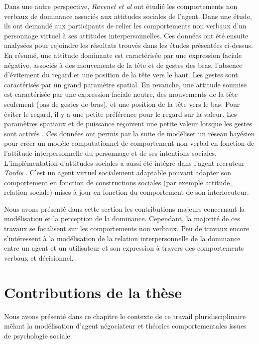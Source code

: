 		Dans une autre perspective,  \emph{Ravenet et al} \cite{ravenet2013user} ont étudié les comportements non verbaux de dominance associés aux attitudes sociales de l'agent. Dans une étude, ils ont demandé aux participants de relier les comportements non verbaux d'un personnage virtuel à ses attitudes interpersonnelles. Ces données ont été ensuite analysées pour rejoindre les résultats trouvés dans les études présentées ci-dessus.  
		En résumé, une attitude dominante est caractérisée par une expression faciale négative, associés à des mouvements de la tête et de gestes des bras, l'absence d'évitement du regard et une position de la tête vers le haut. Les gestes sont caractérisés par un grand paramètre spatial. En revanche, une attitude soumise est caractérisée par une expression faciale neutre, des mouvements de la tête seulement (pas de gestes de bras), et une position de la tête vers le bas. Pour éviter le regard, il y a une petite préférence pour le regard sur la valeur. Les paramètres spatiaux et de puissance reçoivent une petite valeur lorsque les gestes sont activés \cite{ravenet2013user}. Ces données ont permis par la suite de
		modéliser un réseau bayésien pour créer un modèle computationnel de comportement non verbal en fonction de l'attitude interpersonnelle du personnage et de ses intentions sociales.
		L'implémentation d'attitudes sociales a aussi été intégré dans l'agent recruteur \emph{Tardis} \cite{youssef2015towards}. C'est un agent virtuel socialement adaptable pouvant adapter son comportement en fonction de constructions sociales (par exemple attitude, relation sociale) mises à jour en fonction du comportement de son interlocuteur. 
		
		Nous avons présenté dans cette section les contributions majeurs concernant la modélisation et la perception de la dominance. Cependant, la majorité de ces travaux se focalisent sur les comportements non verbaux. Peu de travaux encore s'intéressent à la modélisation de la relation interpersonnelle de la dominance entre un agent et un utilisateur et son expression à travers des comportements verbaux et décisionnel. 
	
	
		\section{Contributions de la thèse}
			Nous avons présenté dans ce chapitre le contexte de ce travail pluridisciplinaire mêlant la modélisation d'agent négociateur et théories comportementales issues de psychologie sociale. 
			

